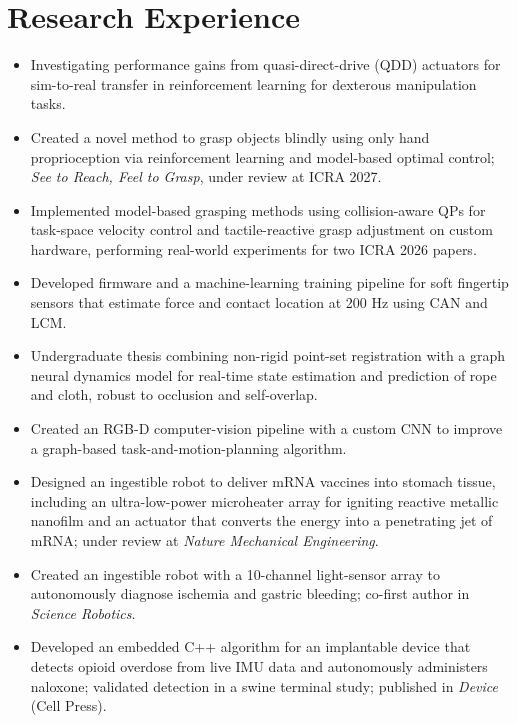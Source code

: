 
\section{Research Experience}
\begin{itemize}
  \item Investigating performance gains from quasi-direct-drive (QDD) actuators for sim-to-real transfer in reinforcement learning for dexterous manipulation tasks.
  \item Created a novel method to grasp objects blindly using only hand proprioception via reinforcement learning and model-based optimal control; \textit{See to Reach, Feel to Grasp}, under review at ICRA 2027.
  \item Implemented model-based grasping methods using collision-aware QPs for task-space velocity control and tactile-reactive grasp adjustment on custom hardware, performing real-world experiments for two ICRA 2026 papers.
  \item Developed firmware and a machine-learning training pipeline for soft fingertip sensors that estimate force and contact location at 200 Hz using CAN and LCM.
\end{itemize}

\begin{itemize}
  \item Undergraduate thesis combining non-rigid point-set registration with a graph neural dynamics model for real-time state estimation and prediction of rope and cloth, robust to occlusion and self-overlap.
  \item Created an RGB-D computer-vision pipeline with a custom CNN to improve a graph-based task-and-motion-planning algorithm.
\end{itemize}

\begin{itemize}
  \item Designed an ingestible robot to deliver mRNA vaccines into stomach tissue, including an ultra-low-power microheater array for igniting reactive metallic nanofilm and an actuator that converts the energy into a penetrating jet of mRNA; under review at \textit{Nature Mechanical Engineering}.
  \item Created an ingestible robot with a 10-channel light-sensor array to autonomously diagnose ischemia and gastric bleeding; co-first author in \textit{Science Robotics}.
  \item Developed an embedded C++ algorithm for an implantable device that detects opioid overdose from live IMU data and autonomously administers naloxone; validated detection in a swine terminal study; published in \textit{Device} (Cell Press).
\end{itemize}

